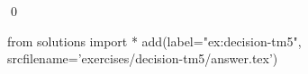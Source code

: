 
\begin{ex} 
  \label{ex:decision-tm5}
  
  \qed
\end{ex} 
\begin{python0}
from solutions import *
add(label="ex:decision-tm5",
    srcfilename='exercises/decision-tm5/answer.tex') 
\end{python0}
